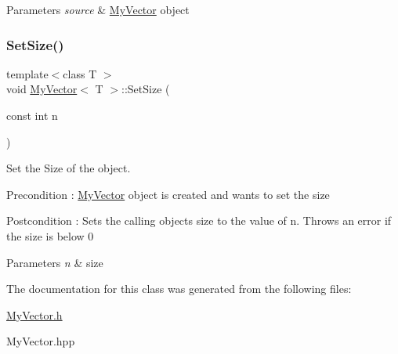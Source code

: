 \begin{DoxyParams}{Parameters}
{\em source} & \mbox{\hyperlink{class_my_vector}{My\+Vector}} object \\
\hline
\end{DoxyParams}
\mbox{\label{class_my_vector_a54da580455b3348ddc47a6359e9db444}} 
\subsubsection{\texorpdfstring{SetSize()}{SetSize()}}
{\footnotesize\ttfamily template$<$class T $>$ \\
void \mbox{\hyperlink{class_my_vector}{My\+Vector}}$<$ T $>$\+::Set\+Size (\begin{DoxyParamCaption}\item[{const int}]{n }\end{DoxyParamCaption})}



Set the Size of the object. 

\begin{DoxyPrecond}{Precondition}
\+: \mbox{\hyperlink{class_my_vector}{My\+Vector}} object is created and want\textquotesingle{}s to set the size 
\end{DoxyPrecond}
\begin{DoxyPostcond}{Postcondition}
\+: Sets the calling object\textquotesingle{}s size to the value of n. Throws an error if the size is below 0 
\end{DoxyPostcond}

\begin{DoxyParams}{Parameters}
{\em n} & size \\
\hline
\end{DoxyParams}


The documentation for this class was generated from the following files\+:\begin{DoxyCompactItemize}
\item 
\mbox{\hyperlink{_my_vector_8h}{My\+Vector.\+h}}\item 
My\+Vector.\+hpp\end{DoxyCompactItemize}
